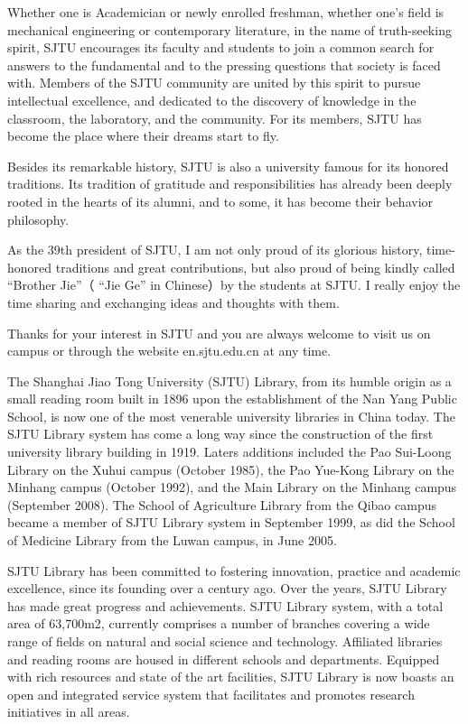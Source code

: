 \begin{bigabstract}
Whether one is Academician or newly enrolled freshman, whether one’s field is mechanical engineering or contemporary literature, in the name of truth-seeking spirit, SJTU encourages its faculty and students to join a common search for answers to the fundamental and to the pressing questions that society is faced with. Members of the SJTU community are united by this spirit to pursue intellectual excellence, and dedicated to the discovery of knowledge in the classroom, the laboratory, and the community. For its members, SJTU has become the place where their dreams start to fly.

Besides its remarkable history, SJTU is also a university famous for its honored traditions. Its tradition of gratitude and responsibilities has already been deeply rooted in the hearts of its alumni, and to some, it has become their behavior philosophy.

As the 39th president of SJTU, I am not only proud of its glorious history, time-honored traditions and great contributions, but also proud of being kindly called “Brother Jie”（ “Jie Ge” in Chinese）by the students at SJTU. I really enjoy the time sharing and exchanging ideas and thoughts with them.

Thanks for your interest in SJTU and you are always welcome to visit us on campus or through the website en.sjtu.edu.cn at any time.

The Shanghai Jiao Tong University (SJTU) Library, from its humble origin as a small reading room built in 1896 upon the establishment of the Nan Yang Public School, is now one of the most venerable university libraries in China today. The SJTU Library system has come a long way since the construction of the first university library building in 1919. Laters additions included the Pao Sui-Loong Library on the Xuhui campus (October 1985), the Pao Yue-Kong Library on the Minhang campus (October 1992), and the Main Library on the Minhang campus (September 2008). The School of Agriculture Library from the Qibao campus became a member of SJTU Library system in September 1999, as did the School of Medicine Library from the Luwan campus, in June 2005.

SJTU Library has been committed to fostering innovation, practice and academic excellence, since its founding over a century ago. Over the years, SJTU Library has made great progress and achievements. SJTU Library system, with a total area of 63,700m2, currently comprises a number of branches covering a wide range of fields on natural and social science and technology. Affiliated libraries and reading rooms are housed in different schools and departments. Equipped with rich resources and state of the art facilities, SJTU Library is now boasts an open and integrated service system that facilitates and promotes research initiatives in all areas.


\end{bigabstract}
